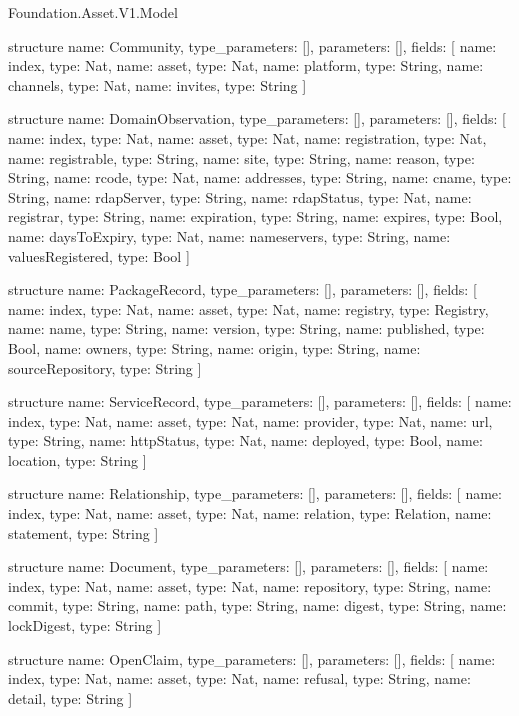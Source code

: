 \begin{lexlean}{Foundation.Asset.V1.Model}
\begin{semanticmodule}
structure{
  name: Community,
  type_parameters: [],
  parameters: [],
  fields: [
    {name: index, type: Nat},
    {name: asset, type: Nat},
    {name: platform, type: String},
    {name: channels, type: Nat},
    {name: invites, type: String}
  ]
}

structure{
  name: DomainObservation,
  type_parameters: [],
  parameters: [],
  fields: [
    {name: index, type: Nat},
    {name: asset, type: Nat},
    {name: registration, type: Nat},
    {name: registrable, type: String},
    {name: site, type: String},
    {name: reason, type: String},
    {name: rcode, type: Nat},
    {name: addresses, type: String},
    {name: cname, type: String},
    {name: rdapServer, type: String},
    {name: rdapStatus, type: Nat},
    {name: registrar, type: String},
    {name: expiration, type: String},
    {name: expires, type: Bool},
    {name: daysToExpiry, type: Nat},
    {name: nameservers, type: String},
    {name: valuesRegistered, type: Bool}
  ]
}

structure{
  name: PackageRecord,
  type_parameters: [],
  parameters: [],
  fields: [
    {name: index, type: Nat},
    {name: asset, type: Nat},
    {name: registry, type: Registry},
    {name: name, type: String},
    {name: version, type: String},
    {name: published, type: Bool},
    {name: owners, type: String},
    {name: origin, type: String},
    {name: sourceRepository, type: String}
  ]
}

structure{
  name: ServiceRecord,
  type_parameters: [],
  parameters: [],
  fields: [
    {name: index, type: Nat},
    {name: asset, type: Nat},
    {name: provider, type: Nat},
    {name: url, type: String},
    {name: httpStatus, type: Nat},
    {name: deployed, type: Bool},
    {name: location, type: String}
  ]
}

structure{
  name: Relationship,
  type_parameters: [],
  parameters: [],
  fields: [
    {name: index, type: Nat},
    {name: asset, type: Nat},
    {name: relation, type: Relation},
    {name: statement, type: String}
  ]
}

structure{
  name: Document,
  type_parameters: [],
  parameters: [],
  fields: [
    {name: index, type: Nat},
    {name: asset, type: Nat},
    {name: repository, type: String},
    {name: commit, type: String},
    {name: path, type: String},
    {name: digest, type: String},
    {name: lockDigest, type: String}
  ]
}

structure{
  name: OpenClaim,
  type_parameters: [],
  parameters: [],
  fields: [
    {name: index, type: Nat},
    {name: asset, type: Nat},
    {name: refusal, type: String},
    {name: detail, type: String}
  ]
}


\end{semanticmodule}
\end{lexlean}
